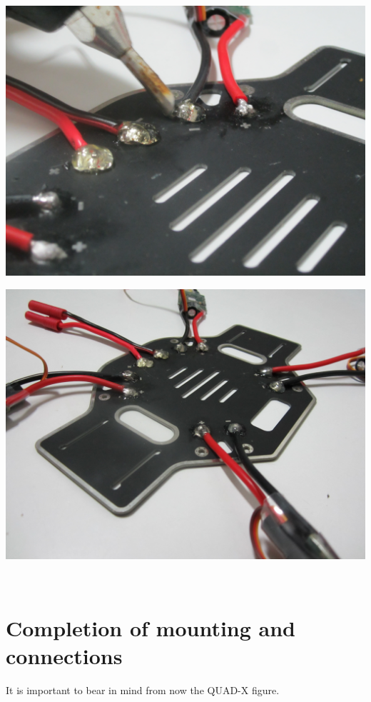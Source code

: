 \documentclass[12pt, a4paper,twoside]{tesi_upf}
\begin{document}
\begin{minipage}{0.5\textwidth}
  \centering
  \includegraphics[width=0.8\linewidth]{Images/Mounting/IMG_0424.jpg}
  \label{fig:app1}
\end{minipage}%
\begin{minipage}{0.5\textwidth}
  \centering
  \includegraphics[width=0.8\linewidth]{Images/Mounting/IMG_0425.jpg}
  \label{fig:app2}
\end{minipage}
\\[12pt]


\section{Completion of mounting and connections}

It is important to bear in mind from now the QUAD-X figure.


\end{document}
